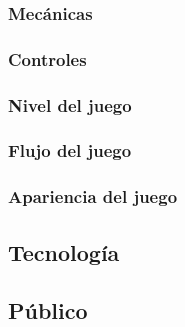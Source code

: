 \subsubsection{Mecánicas}

\subsubsection{Controles}

\subsubsection{Nivel del juego}

\subsubsection{Flujo del juego}

\subsubsection{Apariencia del juego}

\subsection{Tecnología}

\subsection{Público}
